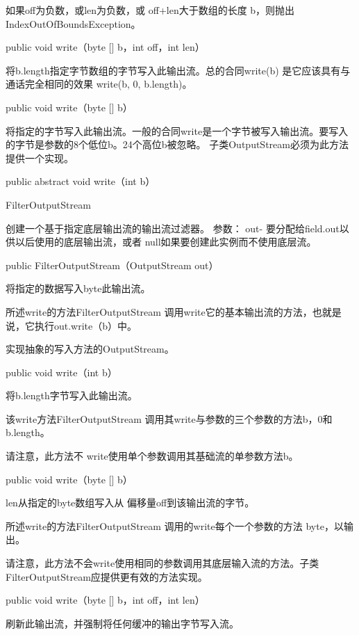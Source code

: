 如果off为负数，或len为负数，或 off+len大于数组的长度 b，则抛出IndexOutOfBoundsException。
\begin{java}
public void write（byte [] b，int off，int len）
\end{java}
将b.length指定字节数组的字节写入此输出流。总的合同write(b) 是它应该具有与通话完全相同的效果 write(b, 0, b.length)。
\begin{java}
public void write（byte [] b）
\end{java}
将指定的字节写入此输出流。一般的合同write是一个字节被写入输出流。要写入的字节是参数的8个低位b。24个高位b被忽略。
子类OutputStream必须为此方法提供一个实现。
\begin{java}
public abstract void write（int b）
\end{java}

FilterOutputStream

创建一个基于指定底层输出流的输出流过滤器。
参数：
out- 要分配给field.out以供以后使用的底层输出流，或者 null如果要创建此实例而不使用底层流。
\begin{java}
public FilterOutputStream（OutputStream  out）
\end{java}
将指定的数据写入byte此输出流。

所述write的方法FilterOutputStream 调用write它的基本输出流的方法，也就是说，它执行out.write（b）中。

实现抽象的写入方法的OutputStream。

\begin{java}
public void write（int b）
\end{java}
将b.length字节写入此输出流。

该write方法FilterOutputStream 调用其write与参数的三个参数的方法b，0和 b.length。

请注意，此方法不 write使用单个参数调用其基础流的单参数方法b。
\begin{java}
public void write（byte [] b）
\end{java}
len从指定的byte数组写入从 偏移量off到该输出流的字节。

所述write的方法FilterOutputStream 调用的write每个一个参数的方法 byte，以输出。

请注意，此方法不会write使用相同的参数调用其底层输入流的方法。子类FilterOutputStream应提供更有效的方法实现。

\begin{java}
public void write（byte [] b，int off，int len）
\end{java}

刷新此输出流，并强制将任何缓冲的输出字节写入流。

